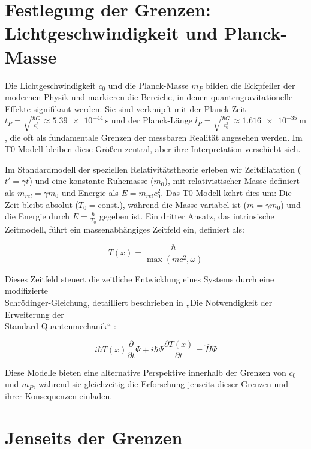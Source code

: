\documentclass[a4paper,12pt]{article}
\newcommand{\Tfield}{T(x)}
\begin{document}
	\section{Festlegung der Grenzen: \\Lichtgeschwindigkeit und Planck-Masse}
	
	Die Lichtgeschwindigkeit \(c_0\) und die Planck-Masse \(m_P\) bilden die Eckpfeiler der modernen Physik und markieren die Bereiche, in denen quantengravitationelle Effekte signifikant werden. Sie sind verknüpft mit der Planck-Zeit \(t_P = \sqrt{\frac{\hbar G}{c_0^5}} \approx \SI{5.39e-44}{\second}\) und der Planck-Länge \(l_P = \sqrt{\frac{\hbar G}{c_0^3}} \approx \SI{1.616e-35}{\meter}\), die oft als fundamentale Grenzen der messbaren Realität angesehen werden. Im T0-Modell bleiben diese Größen zentral, aber ihre Interpretation verschiebt sich.
	
	Im Standardmodell der speziellen Relativitätstheorie erleben wir Zeitdilatation (\(t' = \gamma t\)) und eine konstante Ruhemasse (\(m_0\)), mit relativistischer Masse definiert als \(m_{rel} = \gamma m_0\) und Energie als \(E = m_{rel} c_0^2\). Das T0-Modell kehrt dies um: Die Zeit bleibt absolut (\(T_0 = \text{const.}\)), während die Masse variabel ist (\(m = \gamma m_0\)) und die Energie durch \(E = \frac{\hbar}{T_0}\) gegeben ist. Ein dritter Ansatz, das intrinsische Zeitmodell, führt ein massenabhängiges Zeitfeld ein, definiert als:
	
	\begin{equation}
		\Tfield = \frac{\hbar}{\max(m c^2, \omega)}
	\end{equation}
	
	Dieses Zeitfeld steuert die zeitliche Entwicklung eines Systems durch eine modifizierte \\Schrödinger-Gleichung, detailliert beschrieben in „Die Notwendigkeit der Erweiterung der \\Standard-Quantenmechanik“ \cite{pascher_quantum_2025}:
	
	\begin{equation}
		i\hbar \Tfield \frac{\partial}{\partial t} \Psi + i\hbar \Psi \frac{\partial \Tfield}{\partial t} = \hat{H} \Psi
	\end{equation}
	
	Diese Modelle bieten eine alternative Perspektive innerhalb der Grenzen von \(c_0\) und \(m_P\), während sie gleichzeitig die Erforschung jenseits dieser Grenzen und ihrer Konsequenzen einladen.
	
	\section{Jenseits der Grenzen}
	
\end{document}
